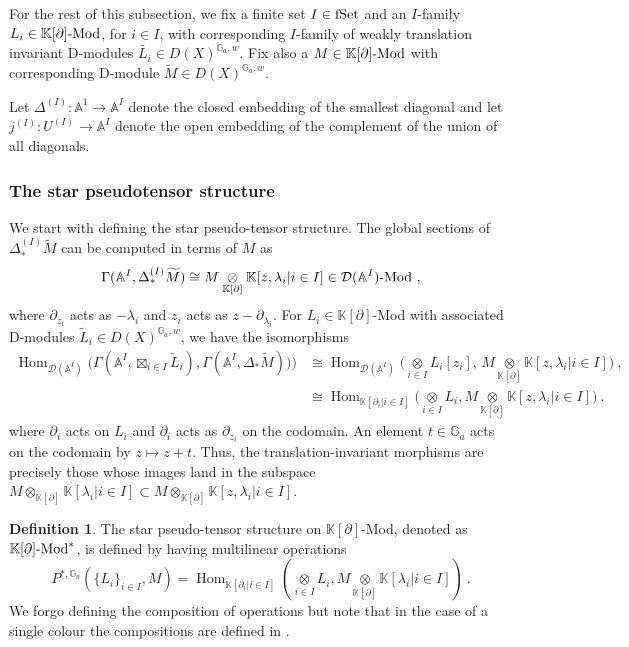 \documentclass[11pt]{amsart}
\numberwithin{equation}{section}
\theoremstyle{definition}
\newtheorem{defn}[theo]{Definition}
\newcommand{\bb}{\mathbb}
\newcommand{\mc}{\mathcal}
\newcommand{\D}{{\mathcal{D}}}
\DeclareMathOperator{\Hom}{Hom}
\newcommand{\Mod}{{\textup{-Mod}}}
\newcommand{\ik}{{\bb K}}
\newcommand{\boxt}{{{\boxtimes }}}
\newcommand{\fset}{{\textup{fSet}}}
\newcommand{\0}{{\textbf{0}}}
\newcommand{\DD}{{D}}
\newcommand{\del}{{{\partial}}}
\def\IA{\mathbb{A}}
\def\IG{\mathbb{G}}
\newcommand{\tensor}[1]{\underset{#1}{\otimes}}
\begin{document}
For the rest of this subsection, we fix a finite set $I\in \fset$ and an $I$-family $L_i\in \ik[\partial]\Mod$, for $i\in I$, with corresponding $I$-family of weakly translation invariant D-modules $\widetilde{L_i}\in\DD(X)^{\IG_a,w}$. Fix also a $M\in \ik[\del]\Mod$ with corresponding D-module $\widetilde{M}\in \DD(X)^{\IG_a,w}$.

Let $\Delta^{(I)}:\IA^1\rightarrow \IA^I$ denote the closed embedding of the smallest diagonal and let $j^{(I)}:U^{(I)} \rightarrow \IA^I$ denote the open embedding of the complement of the union of all diagonals.

\subsubsection{The star pseudotensor structure} 
We start with defining the star pseudo-tensor structure. The global sections of $\Delta^{(I)}_*\widetilde{M}$ can be computed in terms of $M$ as
\[
\Gamma(\IA^I, \Delta^{(I)}_* \widetilde{M}) \cong M\tensor{\ik[\partial]} \ik[z,\lambda_i|i\in I]\in \mc{D}(\IA^I)\textup{-Mod}~,
\]
where $\partial_{z_i}$ acts as $-\lambda_i$ and $z_i$ acts as $z - \partial_{\lambda_i}$. For $L_i\in \ik[\partial]$-Mod with associated D-modules $\widetilde{L}_i\in \DD(X)^{\IG_a,w}$, we have the isomorphisms
\begin{align*}
	\Hom_{\D(\IA^I)}\big(\Gamma(\IA^I, \boxt_{i\in I}\widetilde{L}_i),\Gamma(\IA^I,\Delta_* \widetilde{M}))\big) 
	&\cong \Hom_{\D(\IA^I)}\big(\tensor{i\in I} L_i[z_i],\, M\tensor{\ik[\partial]} \ik[z,\lambda_i|i\in I]\big)~,\\
	&\cong \Hom_{\ik[\partial_i|i\in I]}\big(\tensor{i\in I} L_i, M\tensor{\ik[\partial]} \ik[z,\lambda_i|i\in I]\big)~.
\end{align*}
where $\partial_i$ acts on $L_i$ and $\partial_i$ acts as $\partial_{z_i}$ on the codomain. An element $t\in\IG_a$ acts on the codomain by $z\mapsto z+t$. Thus, the translation-invariant morphisms are precisely those whose images land in the subspace $M\otimes_{\ik[\partial]}\ik[\lambda_i|i\in I]\subset M\otimes_{\ik[\del]}\ik[z,\lambda_i |i\in I]$.

\begin{defn}
	The star pseudo-tensor structure on $\ik[\partial]$-Mod, denoted as $\ik[\partial]\textup{-Mod}^*$, is defined by having multilinear operations
	\[
	P^{*,\IG_a}(\{L_i\}_{i\in I}, M) = \Hom_{\ik[\partial_i|i\in I]}(\tensor{i\in I} L_i, M\tensor{\ik[\partial]}\ik[\lambda_i| i\in I])~.
	\]
	We forgo defining the composition of operations but note that in the case of a single colour the compositions are defined in \cite{BDSHK19}.
\end{defn}
\end{document}
